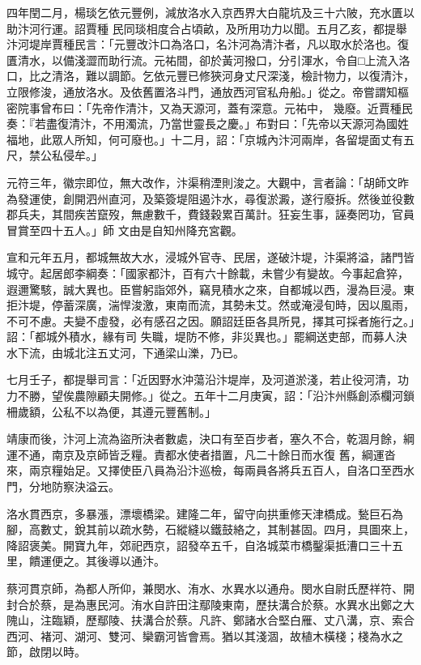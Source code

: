 \begin{pinyinscope}
 四年閏二月，楊琰乞依元豐例，減放洛水入京西界大白龍坑及三十六陂，充水匱以助汴河行運。詔賈種
 民同琰相度合占頃畝，及所用功力以聞。五月乙亥，都提舉汴河堤岸賈種民言：「元豐改汴口為洛口，名汴河為清汴者，凡以取水於洛也。復匱清水，以備淺澀而助行流。元祐間，卻於黃河撥口，分引渾水，令自□上流入洛口，比之清洛，難以調節。乞依元豐已修狹河身丈尺深淺，檢計物力，以復清汴，立限修浚，通放洛水。及依舊置洛斗門，通放西河官私舟船。」從之。帝嘗謂知樞密院事曾布曰：「先帝作清汴，又為天源河，蓋有深意。元祐中，
 幾廢。近賈種民奏：『若盡復清汴，不用濁流，乃當世靈長之慶。」布對曰：「先帝以天源河為國姓福地，此眾人所知，何可廢也。」十二月，詔：「京城內汴河兩岸，各留堤面丈有五尺，禁公私侵牟。」



 元符三年，徽宗即位，無大改作，汴渠稍湮則浚之。大觀中，言者論：「胡師文昨為發運使，創開泗州直河，及築簽堤阻遏汴水，尋復淤澱，遂行廢拆。然後並役數郡兵夫，其間疾苦竄歿，無慮數千，費錢穀累百萬計。狂妄生事，誣奏罔功，官員冒賞至四十五人。」師
 文由是自知州降充宮觀。



 宣和元年五月，都城無故大水，浸城外官寺、民居，遂破汴堤，汴渠將溢，諸門皆城守。起居郎李綱奏：「國家都汴，百有六十餘載，未嘗少有變故。今事起倉猝，遐邇驚駭，誠大異也。臣嘗躬詣郊外，竊見積水之來，自都城以西，漫為巨浸。東拒汴堤，停蓄深廣，湍悍浚激，東南而流，其勢未艾。然或淹浸旬時，因以風雨，不可不慮。夫變不虛發，必有感召之因。願詔廷臣各具所見，擇其可採者施行之。」詔：「都城外積水，緣有司
 失職，堤防不修，非災異也。」罷綱送吏部，而募人決水下流，由城北注五丈河，下通梁山濼，乃已。



 七月壬子，都提舉司言：「近因野水沖蕩沿汴堤岸，及河道淤淺，若止役河清，功力不勝，望俟農隙顧夫開修。」從之。五年十二月庚寅，詔：「沿汴州縣創添欄河鎖柵歲額，公私不以為便，其遵元豐舊制。」



 靖康而後，汴河上流為盜所決者數處，決口有至百步者，塞久不合，乾涸月餘，綱運不通，南京及京師皆乏糧。責都水使者措置，凡二十餘日而水復
 舊，綱運沓來，兩京糧始足。又擇使臣八員為沿汴巡檢，每兩員各將兵五百人，自洛口至西水門，分地防察決溢云。



 洛水貫西京，多暴漲，漂壞橋梁。建隆二年，留守向拱重修天津橋成。甃巨石為腳，高數丈，銳其前以疏水勢，石縱縫以鐵鼓絡之，其制甚固。四月，具圖來上，降詔褒美。開寶九年，郊祀西京，詔發卒五千，自洛城菜市橋鑿渠抵漕口三十五里，饋運便之。其後導以通汴。



 蔡河貫京師，為都人所仰，兼閔水、洧水、水異水以通舟。閔水自尉氏歷祥符、開封合於蔡，是為惠民河。洧水自許田注鄢陵東南，歷扶溝合於蔡。水異水出鄭之大隗山，注臨穎，歷鄢陵、扶溝合於蔡。凡許、鄭諸水合堅白雁、丈八溝，京、索合西河、褚河、湖河、雙河、欒霸河皆會焉。猶以其淺涸，故植木橫棧；棧為水之節，啟閉以時。




\end{pinyinscope}
